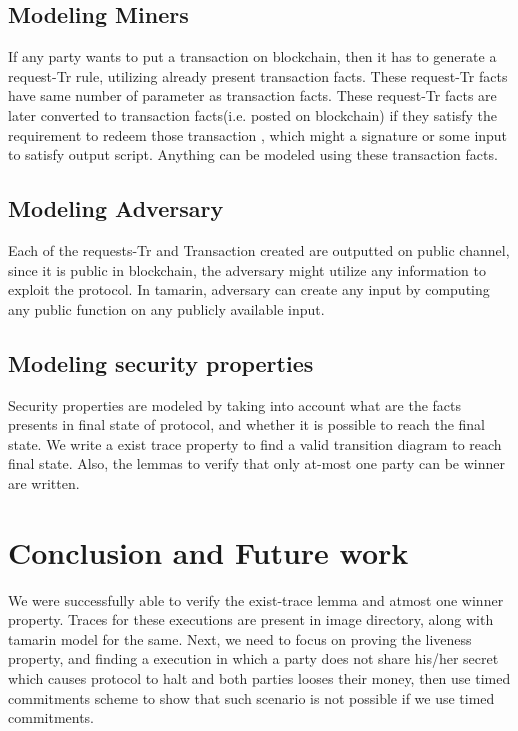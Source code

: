 \documentclass[a4paper]{article}
\begin{document}
\subsection{Modeling Miners}
If any party wants to put a transaction on blockchain, then it has to generate a request-Tr rule, utilizing already present transaction facts. These request-Tr facts have same number of parameter as transaction facts. These request-Tr facts are later converted to transaction facts(i.e. posted on blockchain) if they satisfy the requirement to redeem those transaction , which might a signature or some input to satisfy output script. Anything can be modeled using these transaction facts.\\
\subsection{Modeling Adversary}
Each of the requests-Tr and Transaction created are outputted on public channel, since it is public in blockchain, the adversary might utilize any information to exploit the protocol. In tamarin, adversary can create any input by computing any public function on any publicly available input.

\subsection{Modeling security properties}
Security properties are modeled by taking into account what are the facts presents in final state of protocol, and whether it is possible to reach the final state. We write a exist trace property to find  a valid transition diagram to reach final state. Also, the lemmas to verify that only at-most one party can be winner are written. \\

\section{Conclusion and Future work}
We were successfully able to verify the exist-trace lemma and atmost one winner property. Traces for these executions are present in image directory, along with tamarin model for the same. Next, we need to focus on proving the liveness property, and finding a execution in which a party does not share his/her secret which causes protocol to halt and both parties looses their  money, then use timed commitments scheme to show that such scenario is not possible if we use timed commitments. 
\end{document}
